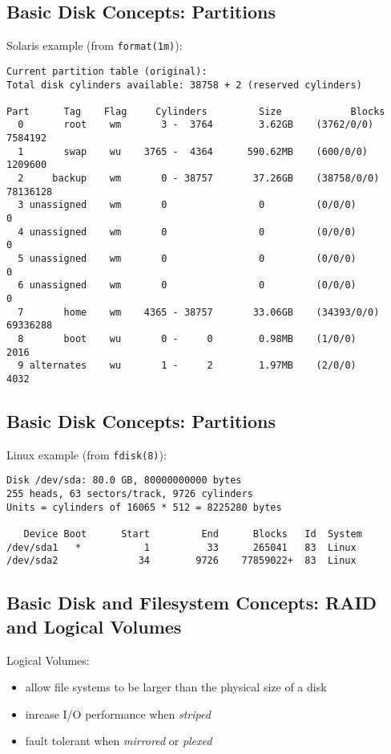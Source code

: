 \documentclass[xga]{xdvislides}
\begin{document}
\subsection{Basic Disk Concepts: Partitions}
Solaris example (from {\tt format(1m)}):
\begin{verbatim}
Current partition table (original):
Total disk cylinders available: 38758 + 2 (reserved cylinders)

Part      Tag    Flag     Cylinders         Size            Blocks
  0       root    wm       3 -  3764        3.62GB    (3762/0/0)   7584192
  1       swap    wu    3765 -  4364      590.62MB    (600/0/0)    1209600
  2     backup    wm       0 - 38757       37.26GB    (38758/0/0) 78136128
  3 unassigned    wm       0                0         (0/0/0)            0
  4 unassigned    wm       0                0         (0/0/0)            0
  5 unassigned    wm       0                0         (0/0/0)            0
  6 unassigned    wm       0                0         (0/0/0)            0
  7       home    wm    4365 - 38757       33.06GB    (34393/0/0) 69336288
  8       boot    wu       0 -     0        0.98MB    (1/0/0)         2016
  9 alternates    wu       1 -     2        1.97MB    (2/0/0)         4032
\end{verbatim}

\subsection{Basic Disk Concepts: Partitions}
Linux example (from {\tt fdisk(8)}):
\begin{verbatim}
Disk /dev/sda: 80.0 GB, 80000000000 bytes
255 heads, 63 sectors/track, 9726 cylinders
Units = cylinders of 16065 * 512 = 8225280 bytes

   Device Boot      Start         End      Blocks   Id  System
/dev/sda1   *           1          33      265041   83  Linux
/dev/sda2              34        9726    77859022+  83  Linux
\end{verbatim}

\subsection{Basic Disk and Filesystem Concepts: RAID and Logical Volumes}
Logical Volumes:
\begin{itemize}
	\item allow file systems to be larger than the physical size of a disk
	\item inrease I/O performance when {\em striped}
	\item fault tolerant when {\em mirrored} or {\em plexed}
\end{itemize}
\end{document}
